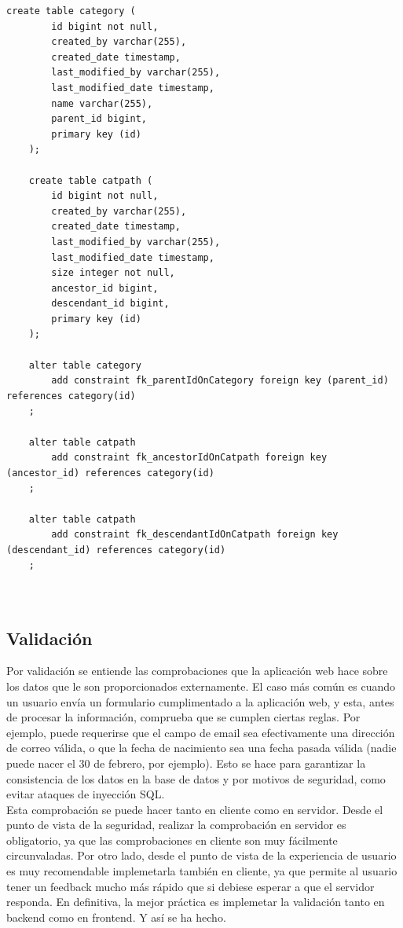 \documentclass[a4paper]{report}
\begin{document}
    \begin{lstlisting}[caption=Tablas que gestionan las categorías]
    create table category (
    	id bigint not null, 
    	created_by varchar(255), 
    	created_date timestamp, 
    	last_modified_by varchar(255), 
    	last_modified_date timestamp, 
    	name varchar(255), 
    	parent_id bigint, 
    	primary key (id)
    );
    	
    create table catpath (
    	id bigint not null, 
    	created_by varchar(255), 
    	created_date timestamp, 
    	last_modified_by varchar(255), 
    	last_modified_date timestamp, 
    	size integer not null, 
    	ancestor_id bigint, 
    	descendant_id bigint, 
    	primary key (id)
    );
    
    alter table category 
    	add constraint fk_parentIdOnCategory foreign key (parent_id) references category(id)
    ;
    
    alter table catpath 
    	add constraint fk_ancestorIdOnCatpath foreign key (ancestor_id) references category(id)
    ;
    
    alter table catpath 
    	add constraint fk_descendantIdOnCatpath foreign key (descendant_id) references category(id)
    ;
    
    
    \end{lstlisting}
    
    \subsection{Validación}
    Por validación se entiende las comprobaciones que la aplicación web hace sobre los datos que le son proporcionados externamente. El caso más común es cuando un usuario envía un formulario cumplimentado a la aplicación web, y esta, antes de procesar la información, comprueba que se cumplen ciertas reglas. Por ejemplo, puede requerirse que el campo de email sea efectivamente una dirección de correo válida, o que la fecha de nacimiento sea una fecha pasada válida (nadie puede nacer el 30 de febrero, por ejemplo). Esto se hace para garantizar la consistencia de los datos en la base de datos y por motivos de seguridad, como evitar ataques de inyección SQL.
    \\
    
    Esta comprobación se puede hacer tanto en cliente como en servidor. Desde el punto de vista de la seguridad, realizar la comprobación en servidor es obligatorio, ya que las comprobaciones en cliente son muy fácilmente circunvaladas. Por otro lado, desde el punto de vista de la experiencia de usuario es muy recomendable implemetarla también en cliente, ya que permite al usuario tener un feedback mucho más rápido que si debiese esperar a que el servidor responda. En definitiva, la mejor práctica es implemetar la validación tanto en backend como en frontend. Y así se ha hecho.
    \\
    
\end{document}
